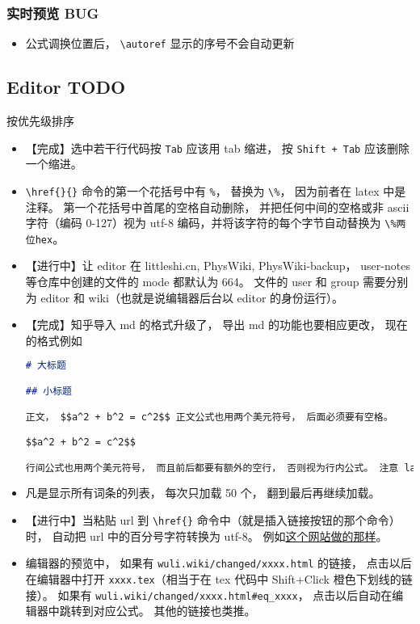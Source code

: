 \subsubsection{实时预览 BUG}
\begin{itemize}
\item 公式调换位置后， \verb|\autoref| 显示的序号不会自动更新
\end{itemize}

\subsection{Editor TODO}
按优先级排序
\begin{itemize}
\item 【完成】选中若干行代码按 \verb|Tab| 应该用 tab 缩进， 按 \verb|Shift + Tab| 应该删除一个缩进。
\item \verb|\href{}{}| 命令的第一个花括号中有 \verb|%|， 替换为 \verb|\%|， 因为前者在 latex 中是注释。 第一个花括号中首尾的空格自动删除， 并把任何中间的空格或非 ascii 字符（编码 0-127）视为 utf-8 编码，并将该字符的每个字节自动替换为 \verb|\%两位hex|。
\item 【进行中】让 editor 在 littleshi.cn, PhysWiki, PhysWiki-backup， user-notes 等仓库中创建的文件的 mode 都默认为 664。 文件的 user 和 group 需要分别为 editor 和 wiki（也就是说编辑器后台以 editor 的身份运行）。
\item 【完成】知乎导入 md 的格式升级了， 导出 md 的功能也要相应更改， 现在的格式例如
\begin{lstlisting}[language=markdown]
# 大标题

## 小标题

正文， $$a^2 + b^2 = c^2$$ 正文公式也用两个美元符号， 后面必须要有空格。

$$a^2 + b^2 = c^2$$

行间公式也用两个美元符号， 而且前后都要有额外的空行， 否则视为行内公式。 注意 latex 代码还是要使用 html 中的而不是 tex 中的。
\end{lstlisting}

\item 凡是显示所有词条的列表， 每次只加载 50 个， 翻到最后再继续加载。

\item 【进行中】当粘贴 url 到 \verb|\href{}| 命令中（就是插入链接按钮的那个命令）时， 自动把 url 中的百分号字符转换为 utf-8。 例如\href{https://www.webatic.com/url-convertor}{这个网站做的那样}。

\item 编辑器的预览中， 如果有 \verb|wuli.wiki/changed/xxxx.html| 的链接， 点击以后在编辑器中打开 \verb|xxxx.tex|（相当于在 tex 代码中 Shift+Click 橙色下划线的链接）。 如果有 \verb|wuli.wiki/changed/xxxx.html#eq_xxxx|， 点击以后自动在编辑器中跳转到对应公式。 其他的链接也类推。


\end{itemize}
